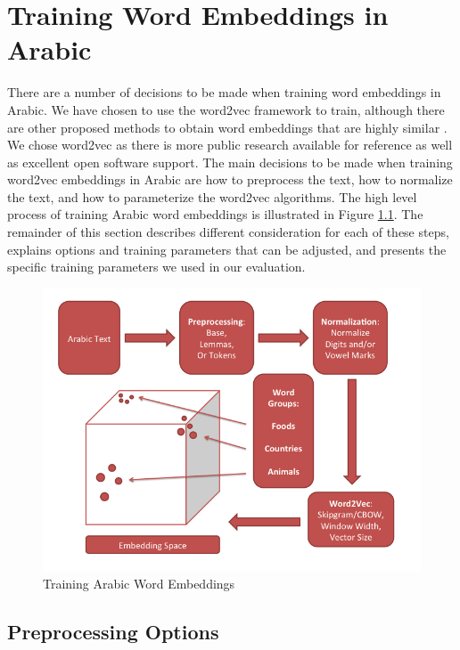 \chapter{Training Word Embeddings in Arabic}
\label{sec:training}

There are a number of decisions to be made when training word embeddings in Arabic. We have chosen to use the word2vec framework to train, although there are other proposed methods to obtain word embeddings that are highly similar \cite{pennington2014glove}. We chose word2vec as there is more public research available for reference as well as excellent open software support. The main decisions to be made when training word2vec embeddings in Arabic are how to preprocess the text, how to normalize the text, and how to parameterize the word2vec algorithms. The high level process of training Arabic word embeddings is illustrated in Figure \ref{fig:training}. The remainder of this section describes different consideration for each of these steps, explains options and training parameters that can be adjusted, and presents the specific training parameters we used in our evaluation. 

\begin{figure}
  \includegraphics[width=\linewidth]{diagrams/Slide1.png}
  \caption{Training Arabic Word Embeddings}
  \label{fig:training}
\end{figure}

\section{Preprocessing Options}

